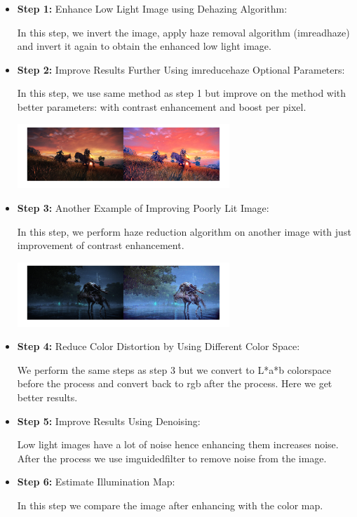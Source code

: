 \documentclass[conference]{IEEEtran}
\begin{document}
\begin{itemize}
  \item \textbf{Step 1:} Enhance Low Light Image using Dehazing Algorithm:
  
  In this step, we invert the image, apply haze removal algorithm (imreadhaze) and invert it again to obtain the enhanced low light image.
  
  \item \textbf{Step 2:} Improve Results Further Using imreducehaze Optional Parameters:
  
  In this step, we use same method as step 1 but improve on the method with better parameters: with contrast enhancement and boost per pixel.
  
  \includegraphics[width=8cm]{images/step2.png}
  
  \item \textbf{Step 3:} Another Example of Improving Poorly Lit Image:
  
  In this step, we perform haze reduction algorithm on another image with just improvement of contrast enhancement.
  
  \includegraphics[width=8cm]{images/step3.png}
  
  \item \textbf{Step 4:} Reduce Color Distortion by Using Different Color Space:
  
  We perform the same steps as step 3 but we convert to L*a*b colorspace before the process and convert back to rgb after the process. Here we get better results.
  
  \item \textbf{Step 5:} Improve Results Using Denoising:
  
  Low light images have a lot of noise hence enhancing them increases noise. After the process we use imguidedfilter to remove noise from the image.
  
  \item \textbf{Step 6:} Estimate Illumination Map:
  
  In this step we compare the image after enhancing with the color map.
  
\end{itemize}
\end{document}
